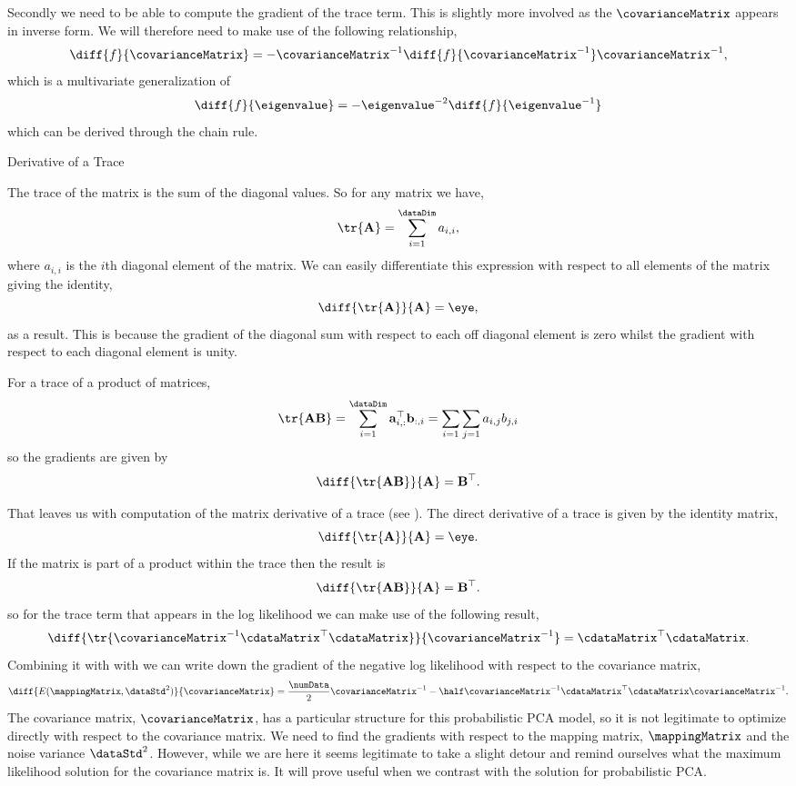 Secondly we need to be able to compute the gradient of the trace
term. This is slightly more involved as the $\covarianceMatrix$ appears in inverse form. We will therefore need to make use of the following relationship,
\[
\diff{f}{\covarianceMatrix} =
-\covarianceMatrix^{-1}\diff{f}{\covarianceMatrix^{-1}}
\covarianceMatrix^{-1},\label{eq:invGrad}
\]
which is a multivariate generalization of
\[
\diff{f}{\eigenvalue} = -\eigenvalue^{-2}\diff{f}{\eigenvalue^{-1}}
\]
which can be derived through the chain rule. 

\begin{intfloat}
  \caption{Derivative of a Trace}\label{int:traceDerivative}

  \boxfontsize The trace of the matrix is the sum of the diagonal
  values. So for any matrix we have,
  \[
  \tr{\mathbf{A}} = \sum_{i=1}^\dataDim a_{i,i},
  \]
  where $a_{i,i}$ is the $i$th diagonal element of the matrix. We can
  easily differentiate this expression with respect to all elements of
  the matrix giving the identity,
  \[
  \diff{\tr{\mathbf{A}}}{\mathbf{A}} = \eye,
  \]
  as a result. This is because the gradient of the diagonal sum with
  respect to each off diagonal element is zero whilst the gradient with
  respect to each diagonal element is unity.

  For a trace of a product of matrices,
  \[
  \tr{\mathbf{A}\mathbf{B}} = \sum_{i=1}^\dataDim \mathbf{a}_{i,
    :}^\top\mathbf{b}_{:,i} = \sum_{i=1}\sum_{j=1} a_{i, j} b_{j,i}
  \]
  so the gradients are given by
  \[
  \diff{\tr{\mathbf{A}\mathbf{B}}}{\mathbf{A}} =\mathbf{B}^\top.
  \]
\end{intfloat}

That leaves us with computation of the matrix derivative of a trace
(see ). The direct derivative of a trace
is given by the identity matrix,
\[
\diff{\tr{\mathbf{A}}}{\mathbf{A}}=\eye. 
\]
If the matrix is part of a product within the trace then the result is
\[
\diff{\tr{\mathbf{A}\mathbf{B}}}{\mathbf{A}}=\mathbf{B}^\top. 
\]
so for the trace term that appears in the log likelihood we can make use of the following result,
\[
\diff{\tr{\covarianceMatrix^{-1}\cdataMatrix^\top\cdataMatrix}}{\covarianceMatrix^{-1}}=\cdataMatrix^\top\cdataMatrix.
\]
Combining it with with  we can write
down the gradient of the negative log likelihood with respect to the
covariance matrix,
\begin{equation}
  \diff{E(\mappingMatrix, \dataStd^2)}{\covarianceMatrix} = \frac{\numData}{2}\covarianceMatrix^{-1} - \half\covarianceMatrix^{-1} \cdataMatrix^\top\cdataMatrix \covarianceMatrix^{-1}.\label{eq:gaussianGrad}
\end{equation}
The covariance matrix, $\covarianceMatrix$, has a particular structure
for this probabilistic PCA model, so it is not legitimate to optimize
directly with respect to the covariance matrix. We need to find the
gradients with respect to the mapping matrix, $\mappingMatrix$ and the
noise variance $\dataStd^2$. However, while we are here it seems
legitimate to take a slight detour and remind ourselves what the
maximum likelihood solution for the covariance matrix is. It will
prove useful when we contrast with the solution for probabilistic PCA.

